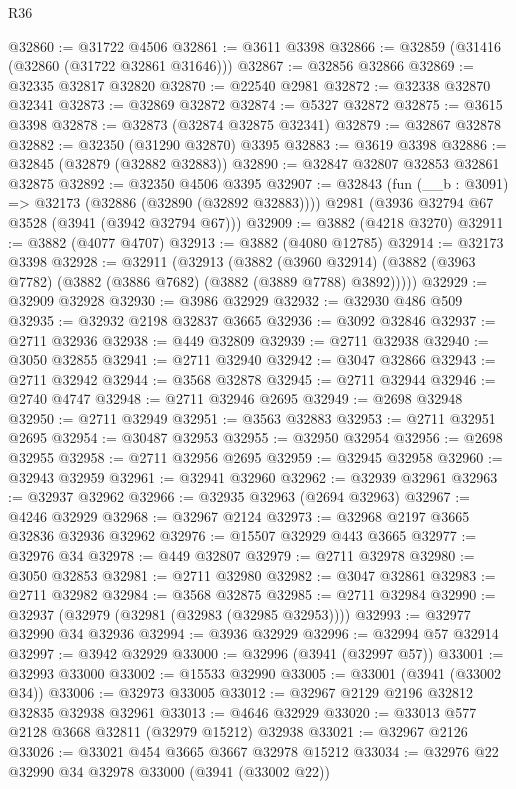 \begin{lexlean}{R36}
\begin{coremodule}
@32860 := @31722 @4506
@32861 := @3611 @3398
@32866 := @32859 (@31416 (@32860 (@31722 @32861 @31646)))
@32867 := @32856 @32866
@32869 := @32335 @32817 @32820
@32870 := @22540 @2981
@32872 := @32338 @32870 @32341
@32873 := @32869 @32872
@32874 := @5327 @32872
@32875 := @3615 @3398
@32878 := @32873 (@32874 @32875 @32341)
@32879 := @32867 @32878
@32882 := @32350 (@31290 @32870) @3395
@32883 := @3619 @3398
@32886 := @32845 (@32879 (@32882 @32883))
@32890 := @32847 @32807 @32853 @32861 @32875
@32892 := @32350 @4506 @3395
@32907 := @32843
    (fun (__b : @3091) => @32173 (@32886 (@32890 (@32892 @32883))))
    @2981
    (@3936 @32794 @67 @3528 (@3941 (@3942 @32794 @67)))
@32909 := @3882 (@4218 @3270)
@32911 := @3882 (@4077 @4707)
@32913 := @3882 (@4080 @12785)
@32914 := @32173 @3398
@32928 := @32911
    (@32913
      (@3882
        (@3960 @32914)
        (@3882 (@3963 @7782) (@3882 (@3886 @7682) (@3882 (@3889 @7788) @3892)))))
@32929 := @32909 @32928
@32930 := @3986 @32929
@32932 := @32930 @486 @509
@32935 := @32932 @2198 @32837 @3665
@32936 := @3092 @32846
@32937 := @2711 @32936
@32938 := @449 @32809
@32939 := @2711 @32938
@32940 := @3050 @32855
@32941 := @2711 @32940
@32942 := @3047 @32866
@32943 := @2711 @32942
@32944 := @3568 @32878
@32945 := @2711 @32944
@32946 := @2740 @4747
@32948 := @2711 @32946 @2695
@32949 := @2698 @32948
@32950 := @2711 @32949
@32951 := @3563 @32883
@32953 := @2711 @32951 @2695
@32954 := @30487 @32953
@32955 := @32950 @32954
@32956 := @2698 @32955
@32958 := @2711 @32956 @2695
@32959 := @32945 @32958
@32960 := @32943 @32959
@32961 := @32941 @32960
@32962 := @32939 @32961
@32963 := @32937 @32962
@32966 := @32935 @32963 (@2694 @32963)
@32967 := @4246 @32929
@32968 := @32967 @2124
@32973 := @32968 @2197 @3665 @32836 @32936 @32962
@32976 := @15507 @32929 @443 @3665
@32977 := @32976 @34
@32978 := @449 @32807
@32979 := @2711 @32978
@32980 := @3050 @32853
@32981 := @2711 @32980
@32982 := @3047 @32861
@32983 := @2711 @32982
@32984 := @3568 @32875
@32985 := @2711 @32984
@32990 := @32937 (@32979 (@32981 (@32983 (@32985 @32953))))
@32993 := @32977 @32990 @34 @32936
@32994 := @3936 @32929
@32996 := @32994 @57 @32914
@32997 := @3942 @32929
@33000 := @32996 (@3941 (@32997 @57))
@33001 := @32993 @33000
@33002 := @15533 @32990
@33005 := @33001 (@3941 (@33002 @34))
@33006 := @32973 @33005
@33012 := @32967 @2129 @2196 @32812 @32835 @32938 @32961
@33013 := @4646 @32929
@33020 := @33013 @577 @2128 @3668 @32811 (@32979 @15212) @32938
@33021 := @32967 @2126
@33026 := @33021 @454 @3665 @3667 @32978 @15212
@33034 := @32976 @22 @32990 @34 @32978 @33000 (@3941 (@33002 @22))

\end{coremodule}
\end{lexlean}
